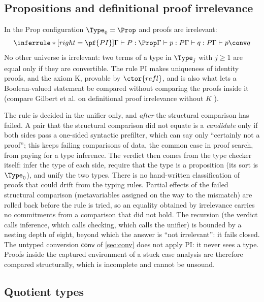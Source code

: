 \subsection{Propositions and definitional proof irrelevance}\label{sec:prop}

In the Prop configuration $\Type_0=\Prop$ and proofs are irrelevant:
\[
\inferrule*[right=\pf{PI}]{\Gamma\vdash P : \Prop \\ \Gamma\vdash p : P \\ \Gamma\vdash q : P}{\Gamma\vdash p \conv q}
\]
No other universe is irrelevant: two terms of a type in $\Type_j$ with $j\ge1$ are equal only if they are convertible.
The rule \textsc{PI} makes uniqueness of identity proofs, and the axiom K, provable by $\ctor{refl}$, and is also what lets a Boolean-valued statement be compared without comparing the proofs inside it (compare Gilbert et al. on definitional proof irrelevance without $K$ \citep{gilbert19}).

The rule is decided in the unifier only, and \emph{after} the structural comparison has failed.
A pair that the structural comparison did not equate is a \emph{candidate} only if both sides pass a one-sided syntactic prefilter, which can say only ``certainly not a proof''; this keeps failing comparisons of data, the common case in proof search, from paying for a type inference.
The verdict then comes from the type checker itself: infer the type of each side, require that the type is a proposition (its sort is $\Type_0$), and unify the two types.
There is no hand-written classification of proofs that could drift from the typing rules.
Partial effects of the failed structural comparison (metavariables assigned on the way to the mismatch) are rolled back before the rule is tried, so an equality obtained by irrelevance carries no commitments from a comparison that did not hold.
The recursion (the verdict calls inference, which calls checking, which calls the unifier) is bounded by a nesting depth of eight, beyond which the answer is ``not irrelevant'': it fails closed.
The untyped conversion $\mathsf{conv}$ of \cref{sec:conv} does not apply \textsc{PI}: it never sees a type.
Proofs inside the captured environment of a stuck case analysis are therefore compared structurally, which is incomplete and cannot be unsound.

\subsection{Quotient types}\label{sec:quot}

